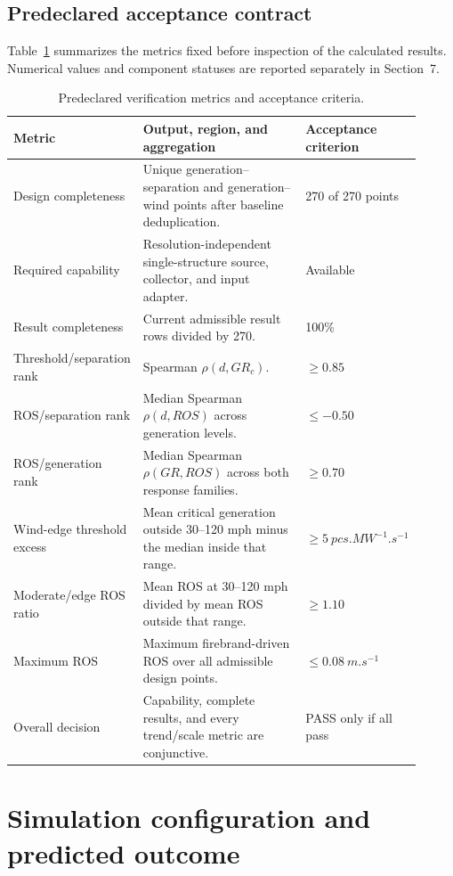 \subsection{Predeclared acceptance contract}

Table~\ref{tab:acceptance-contract} summarizes the metrics fixed before
inspection of the calculated results. Numerical values and component statuses
are reported separately in Section~7.

\begin{table}[H]
\centering
\footnotesize
\caption{Predeclared verification metrics and acceptance criteria.}
\label{tab:acceptance-contract}
\begin{tabular}{@{}p{0.23\linewidth}p{0.47\linewidth}p{0.21\linewidth}@{}}
\toprule
Metric & Output, region, and aggregation & Acceptance criterion\\
\midrule
Design completeness & Unique generation--separation and generation--wind points after baseline deduplication. & 270 of 270 points \\
Required capability & Resolution-independent single-structure source, collector, and input adapter. & Available \\
Result completeness & Current admissible result rows divided by 270. & 100\% \\
Threshold/separation rank & Spearman \(\rho(d,GR_{c})\). & \(\ge0.85\) \\
ROS/separation rank & Median Spearman \(\rho(d,ROS)\) across generation levels. & \(\le-0.50\) \\
ROS/generation rank & Median Spearman \(\rho(GR,ROS)\) across both response families. & \(\ge0.70\) \\
Wind-edge threshold excess & Mean critical generation outside 30--120 mph minus the median inside that range. & \(\ge\SI{5}{pcs.MW^{-1}.s^{-1}}\) \\
Moderate/edge ROS ratio & Mean ROS at 30--120 mph divided by mean ROS outside that range. & \(\ge1.10\) \\
Maximum ROS & Maximum firebrand-driven ROS over all admissible design points. & \(\le\SI{0.08}{m.s^{-1}}\) \\
Overall decision & Capability, complete results, and every trend/scale metric are conjunctive. & PASS only if all pass \\
\bottomrule
\end{tabular}
\end{table}

\section{Simulation configuration and predicted outcome}

